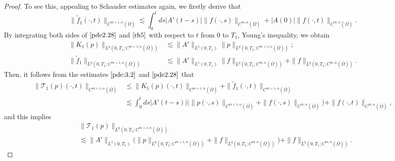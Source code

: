 \documentclass[13pt,CJK]{article}
\theoremstyle{plain}                       %
\theoremstyle{remark}
\numberwithin{equation}{section}
\begin{document}
\begin{proof}
To see this, appealing to Schauder estimates again, we firstly derive that
\begin{equation}\label{rh5}
\|\tilde{f}_1(\cdot,t)\|_{C^{m+1,\alpha}(\bar\Omega)}\lesssim
\int_{0}^{t}ds|A'(t-s)|\|f(\cdot,s)\|_{C^{m,\alpha}(\bar\Omega)}
+|A(0)|\|f(\cdot,t)\|_{C^{m,\alpha}(\bar\Omega)}.
\end{equation}
By integrating both sides of $\eqref{pde2.28}$ and $\eqref{rh5}$ with respect to $t$ from
$0$ to $T_1$, Young's inequality, we obtain
\begin{equation}\label{f:3.2}
\begin{aligned}
\|K_1(p)\|_{L^q(0,T_1;C^{m+1,\alpha}(\bar\Omega))}
&\lesssim \|A'\|_{L^1(0,T_1)}
\|p\|_{L^q(0,T_1;C^{m+1,\alpha}(\bar\Omega))};\\
\|\tilde{f}_1\|_{L^q(0,T_1;C^{m+1,\alpha}(\bar\Omega))}
&\lesssim
\|A'\|_{L^1(0,T_1)}
\|f\|_{L^q(0,T_1;C^{m,\alpha}(\bar\Omega))}
  + \|f\|_{L^q(0,T_1;C^{m,\alpha}(\bar\Omega))}.
\end{aligned}
\end{equation}
Then, it follows from the estimates $\eqref{pde:3.2}$ and $\eqref{pde2.28}$ that
\begin{equation*}
\begin{aligned}
\|\mathcal{T}_1(p)(\cdot,t)\|_{C^{m+1,\alpha}(\bar\Omega)}
&\leq \|K_1(p)(\cdot,t)\|_{C^{m+1,\alpha}(\bar\Omega)}+
\|\tilde{f}_1(\cdot,t)\|_{C^{m+1,\alpha}(\bar\Omega)}\\
&\lesssim \int_{0}^{t}ds|A'(t-s)|
\big(\|p(\cdot,s)\|_{C^{m+1,\alpha}(\bar\Omega)}
+\|f(\cdot,s)\|_{C^{m,\alpha}(\bar\Omega)}\big)
+ \|f(\cdot,t)\|_{C^{m,\alpha}(\bar\Omega)},
\end{aligned}
\end{equation*}
and this implies
\begin{equation}\label{rh4}
\begin{aligned}
&\|\mathcal{T}_1(p)\|_{L^q(0,T_1;C^{m+1,\alpha}(\bar\Omega))} \\
&  \lesssim \|A'\|_{L^1(0,T_1)}
  \big(\|p\|_{L^q(0,T_1;C^{m+1,\alpha}(\bar\Omega))}
  +\|f\|_{L^q(0,T_1;C^{m,\alpha}(\bar\Omega))}\big)
  + \|f\|_{L^q(0,T_1;C^{m,\alpha}(\bar\Omega))}.
\end{aligned}
\end{equation}



\end{proof}
\end{document}
